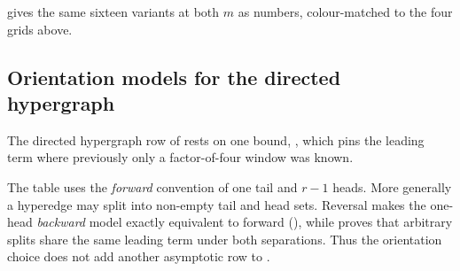  gives the same sixteen variants at both $m$ as numbers, colour-matched to the four grids above.

\begin{table}[p]
    \centering
    \footnotesize
    \resizebox{\textwidth}{!}{%
    }
    \caption{ as numbers, one table for both $m$ and every model. Blue is proved, red conjectured, gold open, matching each figure's curves, and a bold green entry is machine-checked exact regardless of the row's colour. A plain (non-bold) proved entry is still the exact value for every $n$, since the closed form is a theorem there, not a bound reached only at small sizes, except the hypergraph and multihypergraph undirected rows, proved only as an upper bound (): there a $\le$-prefixed entry bounds the true value without being known to equal it. A $\ge$-prefixed entry, in any conjectured or open row, is a verified construction rather than a proved optimum. At $m=6$, $n=6$ that is the hypergraph edge row's $\le12$, where the true maximum, $11$, is established by the full enumeration in the paragraph above rather than by the timed exhaustion behind this table's exact entries. A blank cell means the model does not exist at that $n$: no $r=3$ hyperedge exists on two vertices. Raising $m$ from $3$ to $6$ also moves the undirected simple vertex row, and its multigraph reduction, from proved to open (, valid only for $m\le4$).}
    \label{tab:variant-values}
\end{table}

\subsection{Orientation models for the directed hypergraph}
\label{sec:orientation-models}

The directed hypergraph row of  rests on one bound, , which pins the leading term where previously only a factor-of-four window was known.

The table uses the \emph{forward} convention of one tail and $r-1$ heads. More generally a hyperedge may split into non-empty tail and head sets. Reversal makes the one-head \emph{backward} model exactly equivalent to forward (), while  proves that arbitrary splits share the same leading term under both separations. Thus the orientation choice does not add another asymptotic row to .

